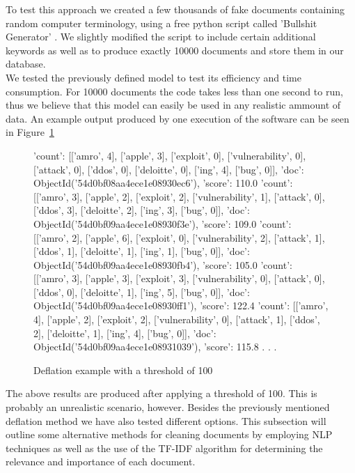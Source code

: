 \documentclass[12pt]{article}
\newcounter{subsubsubsection}[subsubsection]
\begin{document}
To test this approach we created a few thousands of fake documents containing random computer terminology, using a free python script called 'Bullshit Generator' \cite{bullgen}. We slightly modified the script to include certain additional keywords as well as to produce exactly 10000 documents and store them in our database. 
\hfill \break\\
We tested the previously defined model to test its efficiency and time consumption. For 10000 documents the code takes less than one second to run, thus we believe that this model can easily be used in any realistic ammount of data. An example output produced by one execution of the software can be seen in Figure~\ref{fig:deflate}

\begin{figure}[t]
\begin{footnotesize}
\begin{spverbatim}

{'count': [['amro', 4], ['apple', 3], ['exploit', 0], ['vulnerability', 0], ['attack', 0], ['ddos', 0], ['deloitte', 0], ['ing', 4], ['bug', 0]], 'doc': ObjectId('54d0bf08aa4ece1e08930ec6'), 'score': 110.0}
{'count': [['amro', 3], ['apple', 2], ['exploit', 2], ['vulnerability', 1], ['attack', 0], ['ddos', 3], ['deloitte', 2], ['ing', 3], ['bug', 0]], 'doc': ObjectId('54d0bf09aa4ece1e08930f3e'), 'score': 109.0}
{'count': [['amro', 2], ['apple', 6], ['exploit', 0], ['vulnerability', 2], ['attack', 1], ['ddos', 1], ['deloitte', 1], ['ing', 1], ['bug', 0]], 'doc': ObjectId('54d0bf09aa4ece1e08930fb4'), 'score': 105.0}
{'count': [['amro', 3], ['apple', 3], ['exploit', 3], ['vulnerability', 0], ['attack', 0], ['ddos', 0], ['deloitte', 1], ['ing', 5], ['bug', 0]], 'doc': ObjectId('54d0bf09aa4ece1e08930ff1'), 'score': 122.4}
{'count': [['amro', 4], ['apple', 2], ['exploit', 2], ['vulnerability', 0], ['attack', 1], ['ddos', 2], ['deloitte', 1], ['ing', 4], ['bug', 0]], 'doc': ObjectId('54d0bf09aa4ece1e08931039'), 'score': 115.8}
.
.
.
\end{spverbatim}
\end{footnotesize}
\captionsetup{font=small}
\caption{Deflation example with a threshold of 100}
\label{fig:deflate}
\end{figure}
\newpage 
\hfill \break
The above results are produced after applying a threshold of 100. This is probably an unrealistic scenario, however.
Besides the previously mentioned deflation method we have also tested different options. This subsection will outline some alternative methods for cleaning documents by employing NLP techniques as well as the use of the TF-IDF algorithm for determining the relevance and importance of each document.
\newpage
\end{document}
